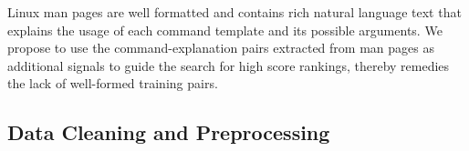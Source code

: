  Linux man pages are well formatted and contains rich natural language text that explains the usage of each command template and its possible arguments. We propose to use the command-explanation pairs extracted from man pages as additional signals to guide the search for high score rankings, thereby remedies the lack of well-formed training pairs.

\subsection{Data Cleaning and Preprocessing}